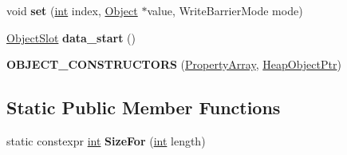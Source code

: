 \begin{DoxyCompactItemize}
void {\bfseries set} (\mbox{\hyperlink{classint}{int}} index, \mbox{\hyperlink{classv8_1_1internal_1_1Object}{Object}} $\ast$value, Write\+Barrier\+Mode mode)
\item 
\mbox{\label{classv8_1_1internal_1_1PropertyArray_aebe0855b53554aab597b76f4eb535636}} 
\mbox{\hyperlink{classv8_1_1internal_1_1ObjectSlot}{Object\+Slot}} {\bfseries data\+\_\+start} ()
\item 
\mbox{\label{classv8_1_1internal_1_1PropertyArray_acecb2eb64ff7544cff83afe28f2c8051}} 
{\bfseries O\+B\+J\+E\+C\+T\+\_\+\+C\+O\+N\+S\+T\+R\+U\+C\+T\+O\+RS} (\mbox{\hyperlink{classv8_1_1internal_1_1PropertyArray}{Property\+Array}}, \mbox{\hyperlink{classv8_1_1internal_1_1HeapObjectPtr}{Heap\+Object\+Ptr}})
\end{DoxyCompactItemize}
\subsection*{Static Public Member Functions}
\begin{DoxyCompactItemize}
\item 
\mbox{\label{classv8_1_1internal_1_1PropertyArray_a7f3f1e3dd698aff37b020dfb781f9702}} 
static constexpr \mbox{\hyperlink{classint}{int}} {\bfseries Size\+For} (\mbox{\hyperlink{classint}{int}} length)
\end{DoxyCompactItemize}
